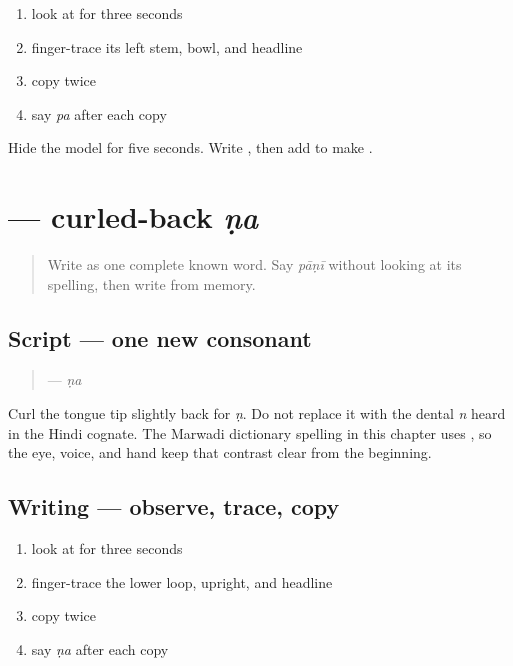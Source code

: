 \begin{enumerate}
\raggedright
  \item look at \textbf{} for three seconds
  \item finger-trace its left stem, bowl, and headline
  \item copy \textbf{} twice
  \item say \emph{pa} after each copy
\end{enumerate}

\begin{tcolorbox}[breakable,colback=teal!4,colframe=teal!35!black,title={Before you move on}]
Hide the model for five seconds. Write \textbf{}, then add \textbf{} to make \textbf{}.
\end{tcolorbox}
\section[\texorpdfstring{\mw{ण} (ṇa)}{ण (ṇa)}]{ — curled-back \emph{ṇa}}

\label{lesson:MW-W04-nna}



\begin{quote}
Write \textbf{} as one complete known word. Say \emph{pāṇī} without looking at its spelling, then write \textbf{} from memory.
\end{quote}

\subsection*{Script — one new consonant}
\begin{quote}
\textbf{} — \emph{ṇa}
\end{quote}

Curl the tongue tip slightly back for \emph{ṇ}. Do not replace it with the dental \emph{n} heard in the Hindi cognate. The Marwadi dictionary spelling in this chapter uses \textbf{}, so the eye, voice, and hand keep that contrast clear from the beginning.

\subsection*{Writing — observe, trace, copy}

\begin{enumerate}
\raggedright
  \item look at \textbf{} for three seconds
  \item finger-trace the lower loop, upright, and headline
  \item copy \textbf{} twice
  \item say \emph{ṇa} after each copy
\end{enumerate}

